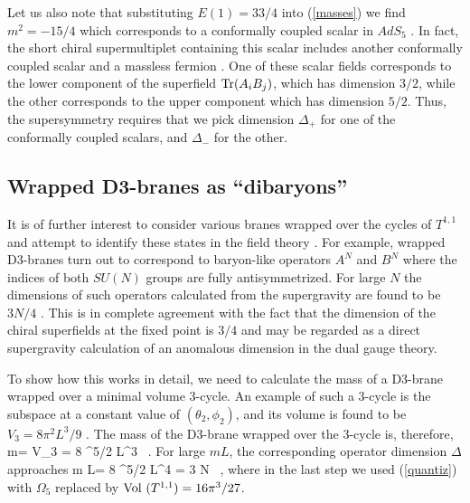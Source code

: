\documentclass[12pt]{article}
\begin{document}
Let us also note that substituting $E(1)=33/4$ into (\ref{masses}) we find
$m^2=-15/4$ which corresponds to a conformally coupled scalar in $AdS_5$
\cite{Kim}. In fact, the short chiral
supermultiplet containing this scalar includes
another conformally coupled scalar and a massless fermion \cite{Ceres}. 
One of these
scalar fields corresponds to the lower component of the superfield
${\rm Tr} (A_i B_j)$, which has dimension $3/2$, while the other
corresponds to the upper component which has dimension $5/2$. Thus,
the supersymmetry requires that we pick dimension $\Delta_+$ for one
of the conformally coupled scalars, and $\Delta_-$ for the other.



\subsection{Wrapped D3-branes as ``dibaryons''}

It is of further interest to consider various branes wrapped 
over the cycles of $T^{1,1}$ and attempt to 
identify these states in the field theory \cite{GK}.
For example, wrapped
D3-branes turn out to correspond to baryon-like operators $A^N$
and $B^N$ where the indices of both $SU(N)$ groups are fully
antisymmetrized.  For large $N$ the dimensions of such operators
calculated from the supergravity are found to be $3N/4$ \cite{GK}. 
This is in
complete agreement with the fact that the dimension of the chiral
superfields at the fixed point is $3/4$ and may be regarded as a direct
supergravity calculation of an anomalous dimension in the dual gauge
theory.

To show how this works in detail, we need to calculate the mass
of a D3-brane wrapped over a minimal volume 3-cycle.
An example of such a 3-cycle is 
the subspace at a constant value of $(\theta_2, \phi_2)$, and its volume
is found to be $V_3= 8\pi^2 L^3/9$ \cite{GK}.
The mass of the D3-brane
wrapped over the 3-cycle is, therefore,
 \be
m= V_3 {\sqrt\pi\over \kappa} = {8 \pi^{5/2} L^3\kappa}
\ .
\ee
For large $mL$, the corresponding operator dimension 
$\Delta$ approaches
\be 
m L= 
{8 \pi^{5/2} L^4\kappa} = {3} N
\ ,
\ee
where in the last step we used (\ref{quantiz}) with $\Omega_5$
replaced by ${\rm Vol}\ (T^{1,1})= 16 \pi^3/ 27$.
\end{document}
